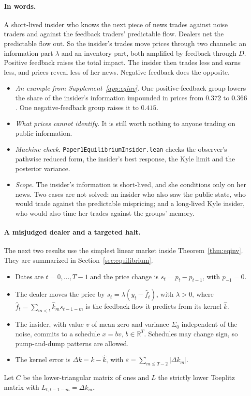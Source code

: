 \documentclass[12pt]{article}
\theoremstyle{definition}
\theoremstyle{remark}
\newcommand{\R}{\mathbb{R}}
\begin{document}
\paragraph{In words.} A short-lived insider who knows the next piece of news trades against noise traders and against the feedback traders' predictable flow. Dealers net the predictable flow out. So the insider's trades move prices through two channels: an information part $\lambda$ and an inventory part, both amplified by feedback through $D$. Positive feedback raises the total impact. The insider then trades less and earns less, and prices reveal less of her news. Negative feedback does the opposite.
\begin{itemize}[itemsep=1pt,topsep=2pt]
\item \emph{An example from Supplement~\ref{app:eqinv}.} One positive-feedback group lowers the share of the insider's information impounded in prices from $0.372$ to $0.366$. One negative-feedback group raises it to $0.415$.
\item \emph{What prices cannot identify.} It is still worth nothing to anyone trading on public information.
\item \emph{Machine check.} \nolinkurl{Paper1EquilibriumInsider.lean} checks the observer's pathwise reduced form, the insider's best response, the Kyle limit and the posterior variance.
\item \emph{Scope.} The insider's information is short-lived, and she conditions only on her news. Two cases are not solved: an insider who also saw the public state, who would trade against the predictable mispricing; and a long-lived Kyle insider, who would also time her trades against the groups' memory.
\end{itemize}
\paragraph{A misjudged dealer and a targeted halt.} The next two results use the simplest linear market inside Theorem~\ref{thm:eqinv}. They are summarized in Section~\ref{sec:equilibrium}.
\begin{itemize}[itemsep=1pt,topsep=2pt]
\item Dates are $t=0,\ldots,T-1$ and the price change is $s_t=p_t-p_{t-1}$, with $p_{-1}=0$.
\item The dealer moves the price by $s_t=\lambda(y_t-\hat f_t)$, with $\lambda>0$, where $\hat f_t=\sum_{m<t}\hat k_ms_{t-1-m}$ is the feedback flow it predicts from its kernel $\hat k$.
\item The insider, with value $v$ of mean zero and variance $\Sigma_0$ independent of the noise, commits to a schedule $x=bv$, $b\in\R^T$. Schedules may change sign, so pump-and-dump patterns are allowed.
\item The kernel error is $\Delta k=k-\hat k$, with $\varepsilon=\sum_{m\le T-2}|\Delta k_m|$.
\end{itemize}
Let $C$ be the lower-triangular matrix of ones and $L$ the strictly lower Toeplitz matrix with $L_{t,t-1-m}=\Delta k_m$.
\end{document}
